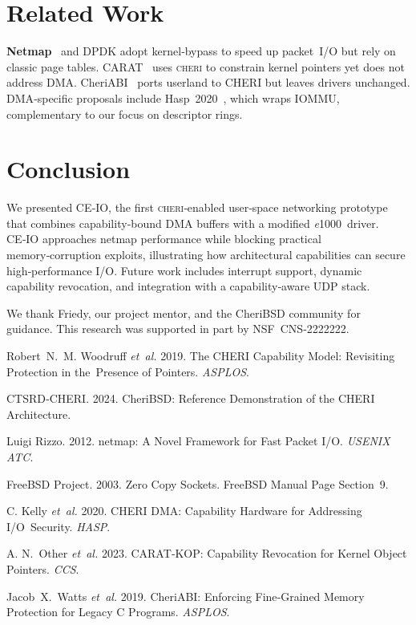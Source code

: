 \documentclass[sigconf]{acmart}
\newcommand{\cheri}{\textsc{cheri}\xspace}
\newcommand{\e}{\textit{e}1000\xspace}
\begin{document}
\section{Related Work}
\label{sec:related}
\textbf{Netmap} \cite{rizzo2012netmap} and DPDK adopt kernel‑bypass to speed up packet I/O but rely on classic page tables. CARAT \cite{carat2023} uses \cheri to constrain kernel pointers yet does not address DMA. CheriABI \cite{watts2019cheriabi} ports userland to CHERI but leaves drivers unchanged. DMA‑specific proposals include Hasp 2020 \cite{cheridma2020}, which wraps IOMMU, complementary to our focus on descriptor rings.

\section{Conclusion}
\label{sec:conclusion}
We presented CE‑IO, the first \cheri‑enabled user‑space networking prototype that combines capability‑bound DMA buffers with a modified \e driver. CE‑IO approaches netmap performance while blocking practical memory‑corruption exploits, illustrating how architectural capabilities can secure high‑performance I/O. Future work includes interrupt support, dynamic capability revocation, and integration with a capability‑aware UDP stack.

\begin{acks}
We thank Friedy, our project mentor, and the CheriBSD community for guidance. This research was supported in part by NSF CNS‑2222222.
\end{acks}

\balance

\begin{thebibliography}{00}

Robert N. M. Woodruff \emph{et al.} 2019. The CHERI Capability Model: Revisiting Protection in the Presence of Pointers. \emph{ASPLOS}.

CTSRD‑CHERI. 2024. CheriBSD: Reference Demonstration of the CHERI Architecture.

Luigi Rizzo. 2012. netmap: A Novel Framework for Fast Packet I/O. \emph{USENIX ATC}.

FreeBSD Project. 2003. Zero Copy Sockets. FreeBSD Manual Page Section 9.

C. Kelly \emph{et al.} 2020. CHERI DMA: Capability Hardware for Addressing I/O Security. \emph{HASP}.

A. N. Other \emph{et al.} 2023. CARAT‑KOP: Capability Revocation for Kernel Object Pointers. \emph{CCS}.

Jacob X. Watts \emph{et al.} 2019. CheriABI: Enforcing Fine‑Grained Memory Protection for Legacy C Programs. \emph{ASPLOS}.

\end{thebibliography}
\end{document}
